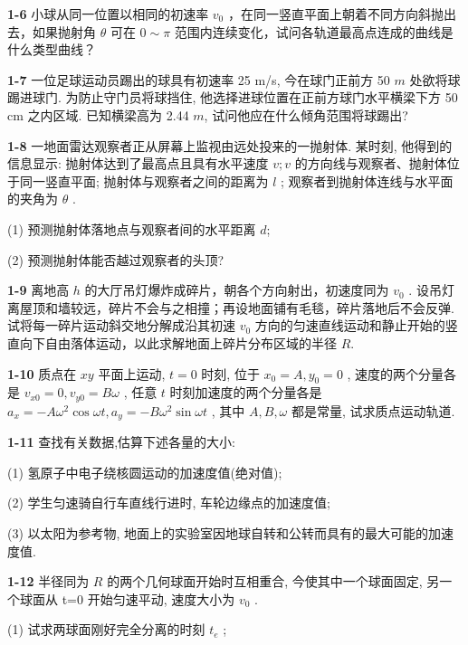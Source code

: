 \newpage

\textbf{1-6} 小球从同一位置以相同的初速率 $v_{0}$ ，在同一竖直平面上朝着不同方向斜抛出去，如果抛射角 $\theta$ 可在 $0 \sim \pi$ 范围内连续变化，试问各轨道最高点连成的曲线是什么类型曲线？

\newpage

\textbf{1-7} 一位足球运动员踢出的球具有初速率 25 m/s, 今在球门正前方 50 $m$ 处欲将球踢进球门. 为防止守门员将球挡住, 他选择进球位置在正前方球门水平横梁下方 50 cm 之内区域. 已知横梁高为 2.44 $m$, 试问他应在什么倾角范围将球踢出?

\newpage

\textbf{1-8} 一地面雷达观察者正从屏幕上监视由远处投来的一抛射体. 某时刻, 他得到的信息显示: 抛射体达到了最高点且具有水平速度 $v; v$ 的方向线与观察者、抛射体位于同一竖直平面; 抛射体与观察者之间的距离为 $l$ ; 观察者到抛射体连线与水平面的夹角为 $\theta$ .

(1) 预测抛射体落地点与观察者间的水平距离 $d$;

(2) 预测抛射体能否越过观察者的头顶?

\newpage

\textbf{1-9} 离地高 $h$ 的大厅吊灯爆炸成碎片，朝各个方向射出，初速度同为 $v_{0}$ . 设吊灯离屋顶和墙较远，碎片不会与之相撞；再设地面铺有毛毯，碎片落地后不会反弹. 试将每一碎片运动斜交地分解成沿其初速 $v_{0}$ 方向的匀速直线运动和静止开始的竖直向下自由落体运动，以此求解地面上碎片分布区域的半径 $R$.

\newpage

\textbf{1-10} 质点在 $xy$ 平面上运动, $t = 0$ 时刻, 位于 $x_0 = A, y_0 = 0$ , 速度的两个分量各是 $v_{x0} = 0, v_{y0} = B\omega$ , 任意 $t$ 时刻加速度的两个分量各是 $a_x = -A\omega^2 \cos \omega t, a_y = -B\omega^2 \sin \omega t$ , 其中 $A, B, \omega$ 都是常量, 试求质点运动轨道.

\newpage

\textbf{1-11} 查找有关数据,估算下述各量的大小:

(1) 氢原子中电子绕核圆运动的加速度值(绝对值);

(2) 学生匀速骑自行车直线行进时, 车轮边缘点的加速度值;

(3) 以太阳为参考物, 地面上的实验室因地球自转和公转而具有的最大可能的加速度值.

\newpage

\textbf{1-12} 半径同为 $R$ 的两个几何球面开始时互相重合, 今使其中一个球面固定, 另一个球面从 t=0 开始匀速平动, 速度大小为 $v_{0}$ .

(1) 试求两球面刚好完全分离的时刻 $t_{e}$ ;

